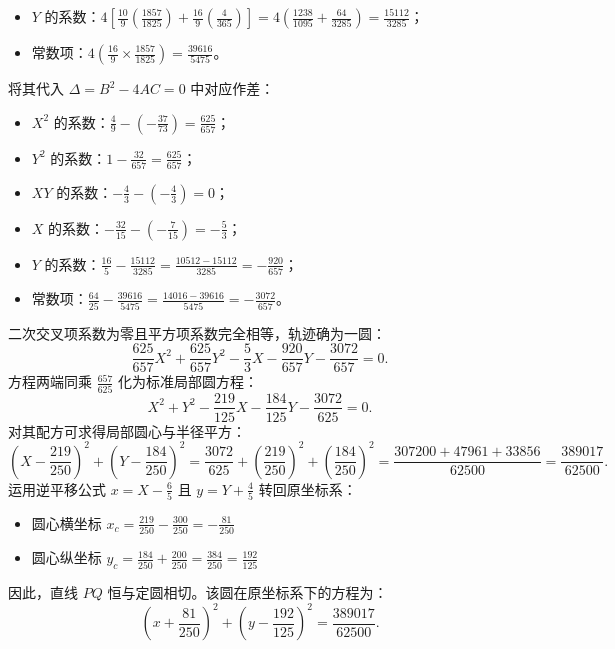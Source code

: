 \begin{solution}
\begin{itemize}
\item $Y$ 的系数：$4\left[ \frac{10}{9}\left(\frac{1857}{1825}\right) + \frac{16}{9}\left(\frac{4}{365}\right) \right] = 4\left(\frac{1238}{1095} + \frac{64}{3285}\right) = \frac{15112}{3285}$；
\item 常数项：$4\left(\frac{16}{9} \times \frac{1857}{1825}\right) = \frac{39616}{5475}$。
\end{itemize}
将其代入 $\Delta = B^2 - 4AC = 0$ 中对应作差：
\begin{itemize}
\item $X^2$ 的系数：$\frac{4}{9} - \left(-\frac{37}{73}\right) = \frac{625}{657}$；
\item $Y^2$ 的系数：$1 - \frac{32}{657} = \frac{625}{657}$；
\item $XY$ 的系数：$-\frac{4}{3} - \left(-\frac{4}{3}\right) = 0$；
\item $X$ 的系数：$-\frac{32}{15} - \left(-\frac{7}{15}\right) = -\frac{5}{3}$；
\item $Y$ 的系数：$\frac{16}{5} - \frac{15112}{3285} = \frac{10512 - 15112}{3285} = -\frac{920}{657}$；
\item 常数项：$\frac{64}{25} - \frac{39616}{5475} = \frac{14016 - 39616}{5475} = -\frac{3072}{657}$。
\end{itemize}
二次交叉项系数为零且平方项系数完全相等，轨迹确为一圆：
\[ \frac{625}{657}X^2 + \frac{625}{657}Y^2 - \frac{5}{3}X - \frac{920}{657}Y - \frac{3072}{657} = 0. \]
方程两端同乘 $\frac{657}{625}$ 化为标准局部圆方程：
\[ X^2 + Y^2 - \frac{219}{125}X - \frac{184}{125}Y - \frac{3072}{625} = 0. \]
对其配方可求得局部圆心与半径平方：
\[ \left(X - \frac{219}{250}\right)^2 + \left(Y - \frac{184}{250}\right)^2 = \frac{3072}{625} + \left(\frac{219}{250}\right)^2 + \left(\frac{184}{250}\right)^2 = \frac{307200 + 47961 + 33856}{62500} = \frac{389017}{62500}. \]
运用逆平移公式 $x = X - \frac{6}{5}$ 且 $y = Y + \frac{4}{5}$ 转回原坐标系：
\begin{itemize}
\item 圆心横坐标 $x_c = \frac{219}{250} - \frac{300}{250} = -\frac{81}{250}$
\item 圆心纵坐标 $y_c = \frac{184}{250} + \frac{200}{250} = \frac{384}{250} = \frac{192}{125}$
\end{itemize}
因此，直线 $PQ$ 恒与定圆相切。该圆在原坐标系下的方程为：
\[ \left(x + \frac{81}{250}\right)^2 + \left(y - \frac{192}{125}\right)^2 = \frac{389017}{62500}. \]

\end{solution}



